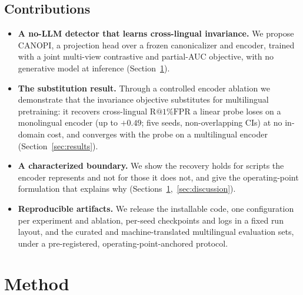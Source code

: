 \documentclass[pdflatex,sn-mathphys-num]{sn-jnl}
\makeatletter
\newcommand{\Rfpr}{\textrm{R@1\%FPR}}
\theoremstyle{plain}
\makeatother
\begin{document}
\subsection*{Contributions}
\begin{itemize}
  \item \textbf{A no-LLM detector that learns cross-lingual invariance.} We propose
  CANOPI, a projection head over a frozen canonicalizer and encoder, trained with a
  joint multi-view contrastive and partial-AUC objective, with no generative model
  at inference (Section~\ref{sec:method}).
  \item \textbf{The substitution result.} Through a controlled encoder ablation we
  demonstrate that the invariance objective substitutes for multilingual
  pretraining: it recovers cross-lingual $\Rfpr$ a linear probe loses on a
  monolingual encoder (up to $+0.49$; five seeds, non-overlapping CIs) at no
  in-domain cost, and converges with the probe on a multilingual encoder
  (Section~\ref{sec:results}).
  \item \textbf{A characterized boundary.} We show the recovery holds for scripts
  the encoder represents and not for those it does not, and give the operating-point
  formulation that explains why (Sections~\ref{sec:method},~\ref{sec:discussion}).
  \item \textbf{Reproducible artifacts.} We release the installable code, one
  configuration per experiment and ablation, per-seed checkpoints and logs in a
  fixed run layout, and the curated and machine-translated multilingual evaluation
  sets, under a pre-registered, operating-point-anchored protocol.
\end{itemize}



\section{Method}\label{sec:method}
\end{document}
